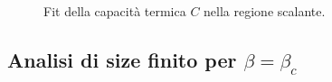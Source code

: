 \documentclass[a4paper,11pt]{article}
\begin{document}
	\begin{figure}
        \centering
        \caption{Fit della capacità termica $C$ nella regione scalante.}
        \label{fig:C_fit}
	\end{figure}

	\subsection{Analisi di size finito per $\beta = \beta_c$}
\end{document}
